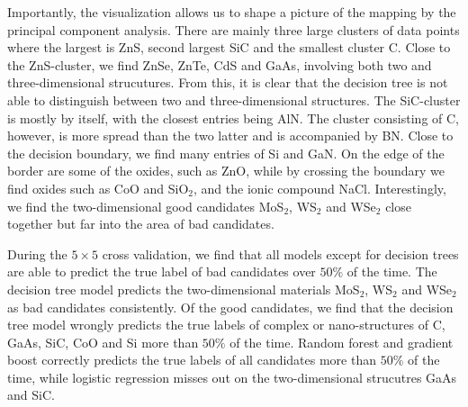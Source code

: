 Importantly, the visualization allows us to shape a picture of the mapping by the principal component analysis. There are mainly three large clusters of data points where the largest is ZnS, second largest SiC and the smallest cluster C. %
Close to the ZnS-cluster, we find ZnSe, ZnTe, CdS and GaAs, involving both two and three-dimensional strucutures. From this, it is clear that the decision tree is not able to distinguish between two and three-dimensional structures. The SiC-cluster is mostly by itself, with the closest entries being AlN. The cluster consisting of C, however, is more spread than the two latter and is accompanied by BN. Close to the decision boundary, we find many entries of Si and GaN. On the edge of the border are some of the oxides, such as ZnO, while by crossing the boundary we find oxides such as CoO and SiO$_2$, and the ionic compound NaCl. Interestingly, we find the two-dimensional good candidates MoS$_2$, WS$_2$ and WSe$_2$ close together but far into the area of bad candidates.

During the $5\times 5$ cross validation, we find that all models except for decision trees are able to predict the true label of bad candidates over $50 \%$ of the time. The decision tree model predicts the two-dimensional materials MoS$_2$, WS$_2$ and WSe$_2$ as bad candidates consistently. Of the good candidates, we find that the decision tree model wrongly predicts the true labels of complex or nano-structures of C, GaAs, SiC, CoO and Si more than $50\%$ of the time. Random forest and gradient boost correctly predicts the true labels of all candidates more than $50\%$ of the time, while logistic regression misses out on the two-dimensional strucutres GaAs and SiC.

